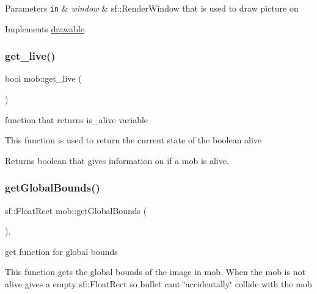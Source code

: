 \begin{DoxyParams}[1]{Parameters}
\mbox{\tt in}  & {\em window} & sf\+::\+Render\+Window that is used to draw picture on \\
\hline
\end{DoxyParams}


Implements \hyperlink{classdrawable_a4e49e2c1121704c83ce24c5f48dd910f}{drawable}.

\mbox{\label{classmob_ab327a1798c02be3f9db7c1d01b17ba02}} 
\subsubsection{\texorpdfstring{get\+\_\+live()}{get\_live()}}
{\footnotesize\ttfamily bool mob\+::get\+\_\+live (\begin{DoxyParamCaption}{ }\end{DoxyParamCaption})}



function that returns is\+\_\+alive variable 

This function is used to return the current state of the boolean alive

\begin{DoxyReturn}{Returns}
boolean that gives information on if a mob is alive. 
\end{DoxyReturn}
\mbox{\label{classmob_af3859378fad2a5f93a1c4d833ff74d5d}} 
\subsubsection{\texorpdfstring{get\+Global\+Bounds()}{getGlobalBounds()}}
{\footnotesize\ttfamily sf\+::\+Float\+Rect mob\+::get\+Global\+Bounds (\begin{DoxyParamCaption}{ }\end{DoxyParamCaption})\hspace{0.3cm}{\ttfamily [override]}, {\ttfamily [virtual]}}



get function for global bounds 

This function gets the global bounds of the image in mob. When the mob is not alive gives a empty sf\+::\+Float\+Rect so bullet can\textquotesingle{}t \char`\"{}accidentally\char`\"{} collide with the mob


